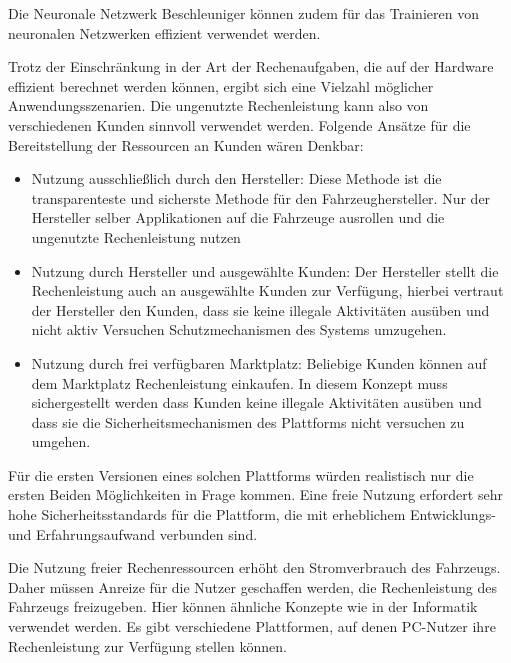 Die Neuronale Netzwerk Beschleuniger können zudem für das Trainieren von neuronalen Netzwerken effizient verwendet werden. 

Trotz der Einschränkung in der Art der Rechenaufgaben, die auf der Hardware effizient berechnet werden können, ergibt sich eine Vielzahl möglicher Anwendungsszenarien. Die ungenutzte Rechenleistung kann also von verschiedenen Kunden sinnvoll verwendet werden. Folgende Ansätze für die Bereitstellung der Ressourcen an Kunden wären Denkbar:

\begin{itemize}
    \item Nutzung ausschließlich durch den Hersteller: Diese Methode ist die transparenteste und sicherste Methode für den Fahrzeughersteller. Nur der Hersteller selber Applikationen auf die Fahrzeuge ausrollen und die ungenutzte Rechenleistung nutzen
    \item Nutzung durch Hersteller und ausgewählte Kunden: Der Hersteller stellt die Rechenleistung auch an ausgewählte Kunden zur Verfügung, hierbei vertraut der Hersteller den Kunden, dass sie keine illegale Aktivitäten ausüben und nicht aktiv Versuchen Schutzmechanismen des Systems umzugehen.
    \item Nutzung durch frei verfügbaren Marktplatz: Beliebige Kunden können auf dem Marktplatz Rechenleistung einkaufen. In diesem Konzept muss sichergestellt werden dass Kunden keine illegale Aktivitäten ausüben und dass sie die Sicherheitsmechanismen des Plattforms nicht versuchen zu umgehen.
\end{itemize}

Für die ersten Versionen eines solchen Plattforms würden realistisch nur die ersten Beiden Möglichkeiten in Frage kommen. Eine freie Nutzung erfordert sehr hohe Sicherheitsstandards für die Plattform, die mit erheblichem Entwicklungs- und Erfahrungsaufwand verbunden sind. 

Die Nutzung freier Rechenressourcen erhöht den Stromverbrauch des Fahrzeugs. Daher müssen Anreize für die Nutzer geschaffen werden, die Rechenleistung des Fahrzeugs freizugeben. Hier können ähnliche Konzepte wie in der Informatik verwendet werden. Es gibt verschiedene Plattformen, auf denen PC-Nutzer ihre Rechenleistung zur Verfügung stellen können. 

